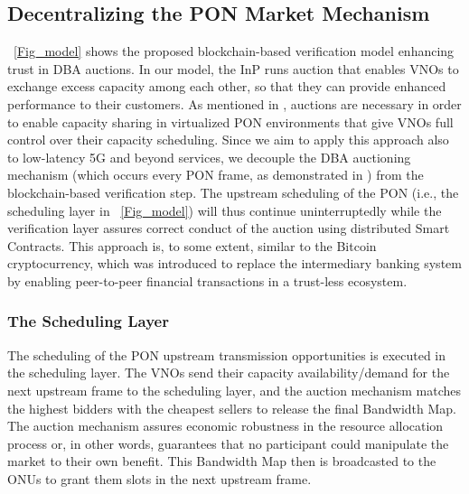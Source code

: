 \subsection{Decentralizing the \ac{PON} Market Mechanism}
\figureautorefname~\ref{Fig_model} shows the proposed blockchain-based verification model enhancing trust in \ac{DBA} auctions. 
In our model, the \ac{InP} runs auction that enables \acp{VNO} to exchange excess capacity among each other, so that they can provide enhanced performance to their customers. As mentioned in \cite{8386208}, auctions are necessary in order to enable capacity sharing in virtualized \ac{PON} environments that give \acp{VNO} full control over their capacity scheduling.
Since we aim to apply this approach also to low-latency 5G and beyond services, we decouple the \ac{DBA} auctioning mechanism (which occurs every \ac{PON} frame, as demonstrated in \cite{8488596}) from the blockchain-based verification step.
The upstream scheduling of the \ac{PON} (i.e., the scheduling layer in \figureautorefname~\ref{Fig_model}) will thus continue uninterruptedly while the verification layer assures correct conduct of the auction using distributed Smart Contracts. This approach is, to some extent, similar to the Bitcoin cryptocurrency, which was introduced to replace the intermediary banking system by enabling peer-to-peer financial transactions in a trust-less ecosystem.
\subsubsection{The Scheduling Layer}
The scheduling of the \ac{PON} upstream transmission opportunities is executed in the scheduling layer. The \acp{VNO} send their capacity availability/demand for the next upstream frame to the scheduling layer, and the auction mechanism \cite{8488596} matches the highest bidders with the cheapest sellers to release the final Bandwidth Map. The auction mechanism assures economic robustness in the resource allocation process or, in other words, guarantees that no participant could manipulate the market to their own benefit.
This Bandwidth Map then is broadcasted to the \acp{ONU} to grant them slots in the next upstream frame.
